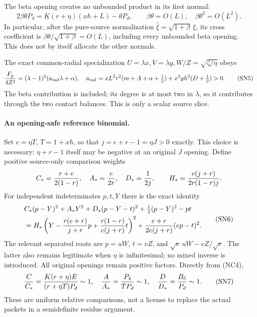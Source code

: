 The beta opening creates no unbounded product in its first normal:
\[
 2\beta\theta P_d=K(r+\eta)(xh+L)-\theta P_d,
 \qquad \beta\theta=O(L),\quad \beta\theta^2=O(L^2).       \tag{SN4}
\]
In particular, after the pure-source normalization
$\widehat\xi=\sqrt{1+\beta}\,\xi$, its cross coefficient is
$\beta\theta/\sqrt{1+\beta}=O(L)$, including every unbounded
beta opening. This does not by itself allocate the other normals.

The exact common-radial specialization
$U=\lambda x,V=\lambda y,W/Z=\sqrt{\zeta/\eta}$ obeys
\[
 \frac{F_g}{4Z^2}=(\lambda-1)^2(a_{\rm rad}\lambda+\alpha),
 \quad a_{\rm rad}=xL^2r^2(m+A+\alpha+\tfrac12)
                   +x^2yh^2(D+\tfrac12)>0.              \tag{SN5}
\]
The beta contribution is included; its degree is at most two in
$\lambda$, so it contributes through the two contact balances.
This is only a scalar source slice.

\paragraph{An opening-safe reference binomial.}
Set $e=\eta T$, $T=1+xh$, so that $j=e+r-1=\eta J>0$ exactly.
This choice is necessary: $\eta+r-1$ itself may be negative at an
original $J$ opening. Define positive source-only comparison weights
\[
 C_*={r+e\over2(1-r)},\quad A_*={e\over2r},\quad
 D_*={1\over2j},\qquad
 H_*={e(j+r)\over2r(1-r)j}.
\]
For independent indeterminates $p,t,Y$ there is the exact identity
\[
\begin{split}
 &C_*(p-Y)^2+A_*Y^2+D_*(p-Y-t)^2
                +\tfrac12(p-Y)^2-pt\\
 &=H_*\left(Y-{r(e+r)\over j+r}p
                    +{r(1-r)\over e(j+r)}t\right)^2
       +{e+r\over2e(j+r)}(ep-t)^2.                    
\end{split}\tag{SN6}
\]
The relevant separated roots are $p=uW$, $t=vZ$, and
$\sqrt e\,uW-vZ/\sqrt e$. The latter also remains legitimate
when $\eta$ is infinitesimal; no mixed inverse is introduced.
All original openings remain positive factors. Directly from (NC4),
\[
 {C\over C_*}={K(r+\eta)E\over(r+\eta T)P_d}\sim1,
 \quad {A\over A_*}={P_4\over TP_d}\sim1,
 \quad {D\over D_*}={B_5\over P_d}\sim1.                 \tag{SN7}
\]
These are uniform relative comparisons, not a license to replace
the actual packets in a semidefinite residue argument.

